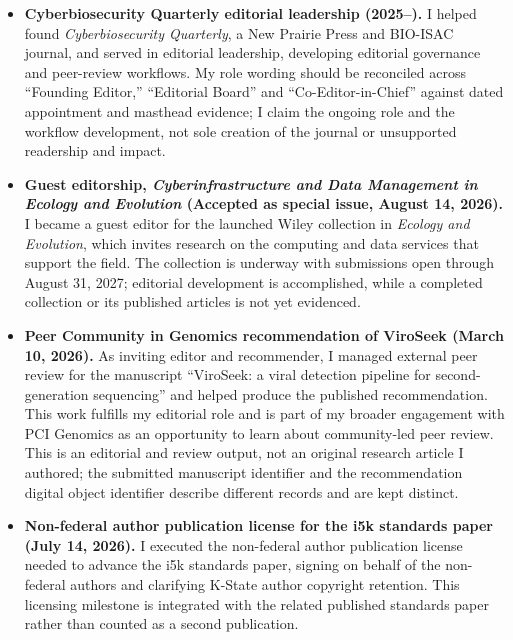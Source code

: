 \begin{itemize}
\item \textbf{Cyberbiosecurity Quarterly editorial leadership (2025--).} I helped found \textit{Cyberbiosecurity Quarterly}, a New Prairie Press and BIO-ISAC journal, and served in editorial leadership, developing editorial governance and peer-review workflows. My role wording should be reconciled across ``Founding Editor,'' ``Editorial Board'' and ``Co-Editor-in-Chief'' against dated appointment and masthead evidence; I claim the ongoing role and the workflow development, not sole creation of the journal or unsupported readership and impact.
\item \textbf{Guest editorship, \textit{Cyberinfrastructure and Data Management in Ecology and Evolution} (Accepted as special issue, August 14, 2026).} I became a guest editor for the launched Wiley collection in \textit{Ecology and Evolution}, which invites research on the computing and data services that support the field. The collection is underway with submissions open through August 31, 2027; editorial development is accomplished, while a completed collection or its published articles is not yet evidenced.
\item \textbf{Peer Community in Genomics recommendation of ViroSeek (March 10, 2026).} As inviting editor and recommender, I managed external peer review for the manuscript ``ViroSeek: a viral detection pipeline for second-generation sequencing'' and helped produce the published recommendation. This work fulfills my editorial role and is part of my broader engagement with PCI Genomics as an opportunity to learn about community-led peer review. This is an editorial and review output, not an original research article I authored; the submitted manuscript identifier and the recommendation digital object identifier describe different records and are kept distinct.
\item \textbf{Non-federal author publication license for the i5k standards paper (July 14, 2026).} I executed the non-federal author publication license needed to advance the i5k standards paper, signing on behalf of the non-federal authors and clarifying K-State author copyright retention. This licensing milestone is integrated with the related published standards paper rather than counted as a second publication.
\end{itemize}

